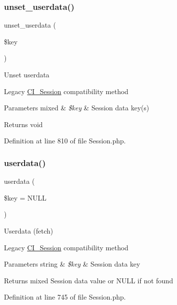 \subsubsection{\texorpdfstring{unset\_userdata()}{unset\_userdata()}}
{\footnotesize\ttfamily unset\+\_\+userdata (\begin{DoxyParamCaption}\item[{}]{\$key }\end{DoxyParamCaption})}

Unset userdata

Legacy \mbox{\hyperlink{class_c_i___session}{C\+I\+\_\+\+Session}} compatibility method


\begin{DoxyParams}[1]{Parameters}
mixed & {\em \$key} & Session data key(s) \\
\hline
\end{DoxyParams}
\begin{DoxyReturn}{Returns}
void 
\end{DoxyReturn}


Definition at line 810 of file Session.\+php.

\mbox{\label{class_c_i___session_ab10006d10762845f93392ef4c2884df6}} 
\subsubsection{\texorpdfstring{userdata()}{userdata()}}
{\footnotesize\ttfamily userdata (\begin{DoxyParamCaption}\item[{}]{\$key = {\ttfamily NULL} }\end{DoxyParamCaption})}

Userdata (fetch)

Legacy \mbox{\hyperlink{class_c_i___session}{C\+I\+\_\+\+Session}} compatibility method


\begin{DoxyParams}[1]{Parameters}
string & {\em \$key} & Session data key \\
\hline
\end{DoxyParams}
\begin{DoxyReturn}{Returns}
mixed Session data value or N\+U\+LL if not found 
\end{DoxyReturn}


Definition at line 745 of file Session.\+php.




